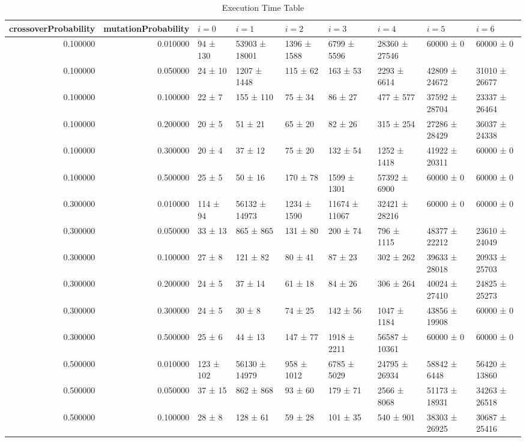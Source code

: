 \begin{table}
\caption{Execution Time Table}
\label{tab:exec_time_table}
\begin{tabular}{rrlllllll}
\toprule
crossoverProbability & mutationProbability & \(i = 0\) & \(i = 1\) & \(i = 2\) & \(i = 3\) & \(i = 4\) & \(i = 5\) & \(i = 6\) \\
\midrule
0.100000 & 0.010000 & 94 ± 130 & 53903 ± 18001 & 1396 ± 1588 & 6799 ± 5596 & 28360 ± 27546 & 60000 ± 0 & 60000 ± 0 \\
0.100000 & 0.050000 & 24 ± 10 & 1207 ± 1448 & 115 ± 62 & 163 ± 53 & 2293 ± 6614 & 42809 ± 24672 & 31010 ± 26677 \\
0.100000 & 0.100000 & 22 ± 7 & 155 ± 110 & 75 ± 34 & 86 ± 27 & 477 ± 577 & 37592 ± 28704 & 23337 ± 26464 \\
0.100000 & 0.200000 & 20 ± 5 & 51 ± 21 & 65 ± 20 & 82 ± 26 & 315 ± 254 & 27286 ± 28429 & 36037 ± 24338 \\
0.100000 & 0.300000 & 20 ± 4 & 37 ± 12 & 75 ± 20 & 132 ± 54 & 1252 ± 1418 & 41922 ± 20311 & 60000 ± 0 \\
0.100000 & 0.500000 & 25 ± 5 & 50 ± 16 & 170 ± 78 & 1599 ± 1301 & 57392 ± 6900 & 60000 ± 0 & 60000 ± 0 \\
0.300000 & 0.010000 & 114 ± 94 & 56132 ± 14973 & 1234 ± 1590 & 11674 ± 11067 & 32421 ± 28216 & 60000 ± 0 & 60000 ± 0 \\
0.300000 & 0.050000 & 33 ± 13 & 865 ± 865 & 131 ± 80 & 200 ± 74 & 796 ± 1115 & 48377 ± 22212 & 23610 ± 24049 \\
0.300000 & 0.100000 & 27 ± 8 & 121 ± 82 & 80 ± 41 & 87 ± 23 & 302 ± 262 & 39633 ± 28018 & 20933 ± 25703 \\
0.300000 & 0.200000 & 24 ± 5 & 37 ± 14 & 61 ± 18 & 84 ± 26 & 306 ± 264 & 40024 ± 27410 & 24825 ± 25273 \\
0.300000 & 0.300000 & 24 ± 5 & 30 ± 8 & 74 ± 25 & 142 ± 56 & 1047 ± 1184 & 43856 ± 19908 & 60000 ± 0 \\
0.300000 & 0.500000 & 25 ± 6 & 44 ± 13 & 147 ± 77 & 1918 ± 2211 & 56587 ± 10361 & 60000 ± 0 & 60000 ± 0 \\
0.500000 & 0.010000 & 123 ± 102 & 56130 ± 14979 & 958 ± 1012 & 6785 ± 5029 & 24795 ± 26934 & 58842 ± 6448 & 56420 ± 13860 \\
0.500000 & 0.050000 & 37 ± 15 & 862 ± 868 & 93 ± 60 & 179 ± 71 & 2566 ± 8068 & 51173 ± 18931 & 34263 ± 26518 \\
0.500000 & 0.100000 & 28 ± 8 & 128 ± 61 & 59 ± 28 & 101 ± 35 & 540 ± 901 & 38303 ± 26925 & 30687 ± 25416 \\

\end{tabular}
\end{table}
